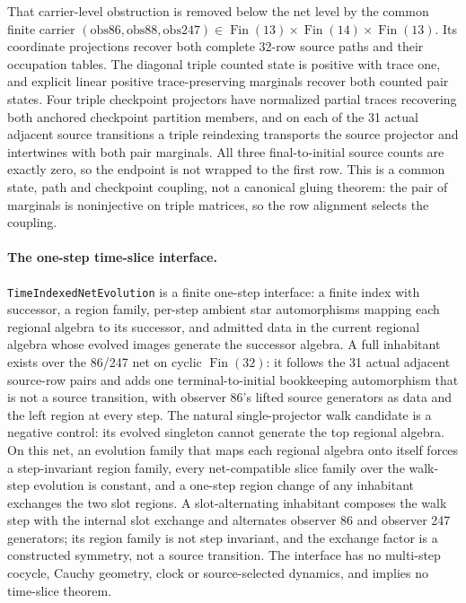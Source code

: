 \documentclass[11pt]{article}
\theoremstyle{remark}
\theoremstyle{plain}
\begin{document}
That carrier-level obstruction is removed below the net level by the common
finite carrier \((\mathrm{obs86},\mathrm{obs88},\mathrm{obs247})\in
\operatorname{Fin}(13)\times\operatorname{Fin}(14)\times\operatorname{Fin}(13)\).
Its coordinate projections recover both complete 32-row source paths and
their occupation tables. The diagonal triple counted state is positive with
trace one, and explicit linear positive trace-preserving marginals recover
both counted pair states. Four triple checkpoint projectors have normalized
partial traces recovering both anchored checkpoint partition members, and
on each of the 31 actual adjacent source transitions a triple reindexing
transports the source projector and intertwines with both pair marginals.
All three final-to-initial source counts are exactly zero, so the endpoint
is not wrapped to the first row. This is a common state, path and
checkpoint coupling, not a canonical gluing theorem: the pair of marginals
is noninjective on triple matrices, so the row alignment selects the
coupling.

\paragraph{The one-step time-slice interface.}
\texttt{TimeIndexedNetEvolution} is a finite one-step interface: a finite
index with successor, a region family, per-step ambient star automorphisms
mapping each regional algebra to its successor, and admitted data in the
current regional algebra whose evolved images generate the successor
algebra. A full inhabitant exists over the 86/247 net on cyclic
\(\operatorname{Fin}(32)\): it follows the 31 actual adjacent source-row
pairs and adds one terminal-to-initial bookkeeping automorphism that is not
a source transition, with observer 86's lifted source generators as data
and the left region at every step. The natural single-projector walk
candidate is a negative control: its evolved singleton cannot generate the
top regional algebra. On this net, an evolution family that maps each
regional algebra onto itself forces a step-invariant region family, every
net-compatible slice family over the walk-step evolution is constant, and
a one-step region change of any inhabitant exchanges the two slot regions.
A slot-alternating inhabitant composes the walk step with the internal slot
exchange and alternates observer 86 and observer 247 generators; its region
family is not step invariant, and the exchange factor is a constructed
symmetry, not a source transition. The interface has no multi-step cocycle,
Cauchy geometry, clock or source-selected dynamics, and implies no
time-slice theorem.
\end{document}
